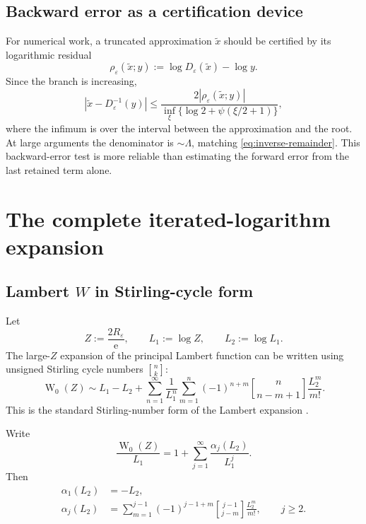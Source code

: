 \documentclass[11pt,a4paper,oneside]{book}
\newcommand{\e}{\mathrm e}
\newcommand{\W}{\operatorname W}
\newcommand{\eps}{\varepsilon}
\begin{document}
\section{Backward error as a certification device}

For numerical work, a truncated approximation \(\widetilde x\) should be
certified by its logarithmic residual
\[
 \rho_\eps(\widetilde x;y)
 :=\log D_\eps(\widetilde x)-\log y.
\]
Since the branch is increasing,
\begin{equation}\label{eq:backward-to-forward}
 |\widetilde x-D_\eps^{-1}(y)|
 \le
 \frac{2|\rho_\eps(\widetilde x;y)|}
 {\inf_{\xi}\{\log2+\psi(\xi/2+1)\}},
\end{equation}
where the infimum is over the interval between the approximation and the
root.  At large arguments the denominator is \(\sim\Lambda\), matching
\cref{eq:inverse-remainder}.  This backward-error test is more reliable than
estimating the forward error from the last retained term alone.

\chapter{The complete iterated-logarithm expansion}

\section{\texorpdfstring{Lambert \(W\)}{Lambert W} in Stirling-cycle form}

Let
\begin{equation}\label{eq:L1L2}
 Z:=\frac{2R_\eps}{\e},
 \qquad L_1:=\log Z,
 \qquad L_2:=\log L_1.
\end{equation}
The large-\(Z\) expansion of the principal Lambert function can be written
using unsigned Stirling cycle numbers
\(\genfrac{[}{]}{0pt}{}{n}{k}\):
\begin{equation}\label{eq:W-Stirling}
 \W_0(Z)
 \sim
 L_1-L_2
 +\sum_{n=1}^\infty\frac1{L_1^n}
 \sum_{m=1}^n
 (-1)^{n+m}
 \genfrac{[}{]}{0pt}{}{n}{n-m+1}
 \frac{L_2^m}{m!}.
\end{equation}
This is the standard Stirling-number form of the Lambert expansion
\cite{Corless1996,DLMF-W}.

Write
\begin{equation}\label{eq:alpha-def}
 \frac{\W_0(Z)}{L_1}
 =1+\sum_{j=1}^\infty
 \frac{\alpha_j(L_2)}{L_1^j}.
\end{equation}
Then
\begin{align}
 \alpha_1(L_2)&=-L_2,\label{eq:alpha1}\\
 \alpha_j(L_2)
 &=
 \sum_{m=1}^{j-1}
 (-1)^{j-1+m}
 \genfrac{[}{]}{0pt}{}{j-1}{j-m}
 \frac{L_2^m}{m!},
 \qquad j\ge2.
 \label{eq:alpha-general}
\end{align}
\end{document}
